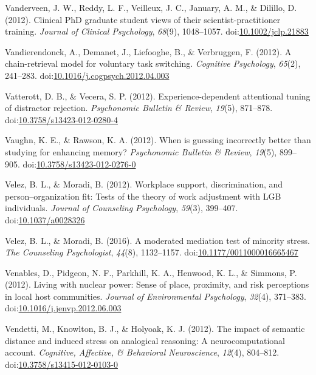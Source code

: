 \documentclass[english,man]{apa6}
\theoremstyle{definition}
\theoremstyle{definition}
\theoremstyle{definition}
\theoremstyle{remark}
\begin{document}
\hypertarget{ref-Vanderveen2012}{}
Vanderveen, J. W., Reddy, L. F., Veilleux, J. C., January, A. M., \&
Dilillo, D. (2012). Clinical PhD graduate student views of their
scientist-practitioner training. \emph{Journal of Clinical Psychology},
\emph{68}(9), 1048--1057.
doi:\href{https://doi.org/10.1002/jclp.21883}{10.1002/jclp.21883}

\hypertarget{ref-Vandierendonck2012}{}
Vandierendonck, A., Demanet, J., Liefooghe, B., \& Verbruggen, F.
(2012). A chain-retrieval model for voluntary task switching.
\emph{Cognitive Psychology}, \emph{65}(2), 241--283.
doi:\href{https://doi.org/10.1016/j.cogpsych.2012.04.003}{10.1016/j.cogpsych.2012.04.003}

\hypertarget{ref-Vatterott2012}{}
Vatterott, D. B., \& Vecera, S. P. (2012). Experience-dependent
attentional tuning of distractor rejection. \emph{Psychonomic Bulletin
\& Review}, \emph{19}(5), 871--878.
doi:\href{https://doi.org/10.3758/s13423-012-0280-4}{10.3758/s13423-012-0280-4}

\hypertarget{ref-Vaughn2012}{}
Vaughn, K. E., \& Rawson, K. A. (2012). When is guessing incorrectly
better than studying for enhancing memory? \emph{Psychonomic Bulletin \&
Review}, \emph{19}(5), 899--905.
doi:\href{https://doi.org/10.3758/s13423-012-0276-0}{10.3758/s13423-012-0276-0}

\hypertarget{ref-Velez2012}{}
Velez, B. L., \& Moradi, B. (2012). Workplace support, discrimination,
and person--organization fit: Tests of the theory of work adjustment
with LGB individuals. \emph{Journal of Counseling Psychology},
\emph{59}(3), 399--407.
doi:\href{https://doi.org/10.1037/a0028326}{10.1037/a0028326}

\hypertarget{ref-Velez2016}{}
Velez, B. L., \& Moradi, B. (2016). A moderated mediation test of
minority stress. \emph{The Counseling Psychologist}, \emph{44}(8),
1132--1157.
doi:\href{https://doi.org/10.1177/0011000016665467}{10.1177/0011000016665467}

\hypertarget{ref-Venables2012}{}
Venables, D., Pidgeon, N. F., Parkhill, K. A., Henwood, K. L., \&
Simmons, P. (2012). Living with nuclear power: Sense of place,
proximity, and risk perceptions in local host communities. \emph{Journal
of Environmental Psychology}, \emph{32}(4), 371--383.
doi:\href{https://doi.org/10.1016/j.jenvp.2012.06.003}{10.1016/j.jenvp.2012.06.003}

\hypertarget{ref-Vendetti2012}{}
Vendetti, M., Knowlton, B. J., \& Holyoak, K. J. (2012). The impact of
semantic distance and induced stress on analogical reasoning: A
neurocomputational account. \emph{Cognitive, Affective, \& Behavioral
Neuroscience}, \emph{12}(4), 804--812.
doi:\href{https://doi.org/10.3758/s13415-012-0103-0}{10.3758/s13415-012-0103-0}
\end{document}
